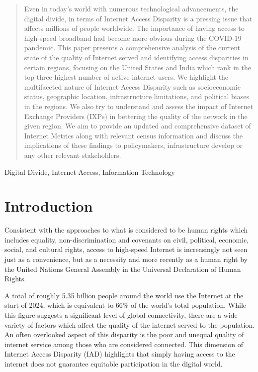 \documentclass[conference]{IEEEtran}
\begin{document}
\begin{abstract}

Even in today's world with numerous technological advancements, the digital divide, in terms of Internet Access Disparity is a pressing issue that affects millions of people worldwide. The importance of having access to high-speed broadband had become more obvious during the COVID-19 pandemic. This paper presents a comprehensive analysis of the current state of the quality of Internet served and identifying access disparities in certain regions, focusing on the United States and India which rank in the top three highest number of active internet users. We highlight the multifaceted nature of Internet Access Disparity such as socioeconomic status, geographic location, infrastructure limitations, and political biases in the regions. We also try to understand and assess the impact of Internet Exchange Providers (IXPs) in bettering the quality of the network in the given region. We aim to provide an updated and comprehensive dataset of Internet Metrics along with relevant census information and discuss the implications of these findings to policymakers, infrastructure develop or any other relevant stakeholders.

\end{abstract}

\begin{IEEEkeywords}
Digital Divide, Internet Access, Information Technology
\end{IEEEkeywords}

\section{Introduction}
    Consistent with the approaches to what is considered to be human rights which includes equality, non-discrimination and covenants on civil, political, economic, social, and cultural rights, access to high-speed Internet is increasingly not seen just as a convenience, but as a necessity and more recently as a human right by the United Nations General Assembly in the Universal Declaration of Human Rights.

   A total of roughly 5.35 billion people around the world use the Internet at the start of 2024, which is equivalent to 66\% of the world's total population. While this figure suggests a significant level of global connectivity, there are a wide variety of factors which affect the quality of the internet served to the population. An often overlooked aspect of this disparity is the poor and unequal quality of internet service among those who are considered connected. This dimension of Internet Access Disparity (IAD) highlights that simply having access to the internet does not guarantee equitable participation in the digital world. 
\end{document}
